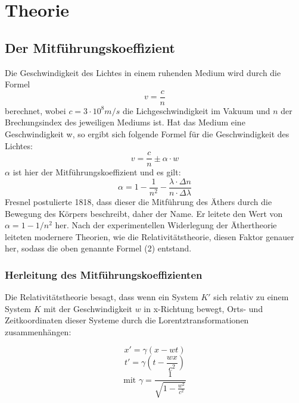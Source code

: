 \section{Theorie}

\subsection{Der Mitführungskoeffizient}

Die Geschwindigkeit des Lichtes in einem ruhenden Medium wird durch die Formel $$v=\frac{c}{n}$$ berechnet, wobei $c = 3\cdot 10^8 m/s$ die Lichgeschwindigkeit im Vakuum und $n$ der Brechungsindex des jeweiligen Mediums ist. Hat das Medium eine Geschwindigkeit w, so ergibt sich folgende Formel für die Geschwindigkeit des Lichtes:
\begin{equation} v = \frac{c}{n} \pm \alpha\cdot w  \end{equation}
$\alpha$ ist hier der Mitführungskoeffizient und es gilt:
\begin{equation} \alpha = 1 - \frac{1}{n^2} - \frac{\lambda\cdot\Delta n}{n \cdot\Delta\lambda} \end{equation}
Fresnel postulierte 1818, dass dieser die Mitführung des Äthers durch die Bewegung des Körpers beschreibt, daher der Name. Er leitete den Wert von $\alpha = 1 - 1/n^2$ her. Nach der experimentellen Widerlegung der Äthertheorie leiteten modernere Theorien, wie die Relativitätstheorie, diesen Faktor genauer her, sodass die oben genannte Formel (2) entstand.

\subsubsection{Herleitung des Mitführungskoeffizienten}

Die Relativitätstheorie besagt, dass wenn ein System $K'$ sich relativ zu einem System $K$ mit der Geschwindigkeit $w$ in x-Richtung bewegt, Orts- und Zeitkoordinaten dieser Systeme durch die Lorentztransformationen zusammenhängen: 

\begin{equation} x' = \gamma (x-wt) \end{equation}
\begin{equation} t' = \gamma \left(t-\frac{wx}{c^2}\right) \end{equation}
\begin{equation} \text{mit \ } \gamma = \frac{1}{\sqrt{1-\frac{w^2}{c^2}}} \end{equation}

